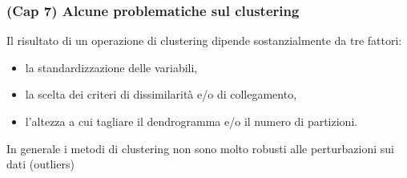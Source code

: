 \documentclass[
]{article}
\begin{document}
\hypertarget{cap-7-alcune-problematiche-sul-clustering}{%
\subsubsection{(Cap 7) Alcune problematiche sul
clustering}\label{cap-7-alcune-problematiche-sul-clustering}}

Il risultato di un operazione di clustering dipende sostanzialmente da
tre fattori:

\begin{itemize}
\item
  la standardizzazione delle variabili,
\item
  la scelta dei criteri di dissimilarità e/o di collegamento,
\item
  l'altezza a cui tagliare il dendrogramma e/o il numero di partizioni.
\end{itemize}

In generale i metodi di clustering non sono molto robusti alle
perturbazioni sui dati (outliers)
\end{document}
